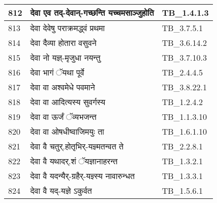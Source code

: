 \documentclass[17pt]{extarticle}
\begin{document}
\begin{longtable}{||p{0.4in}||p{4.9in}||p{0.9in}||}
    \hline
        
    812 & देवा एव तद्{-}देवान्{-}गच्छन्ति यच्चमसाञ्जुहोति & TB\_1.4.1.3       \\
    
    \hline
        
    813 & देवा देवेषु पराक्रमद्ध्वं प्रथमा & TB\_3.7.5.1       \\
    
    \hline
        
    814 & देवा दैव्या होतारा वसुवने & TB\_3.6.14.2       \\
    
    \hline
        
    815 & देवा नो यज्ञ्{-}मृजुधा नयन्तु & TB\_3.7.10.3       \\
    
    \hline
        
    816 & देवा भागं ॅयथा पूर्वे & TB\_2.4.4.5       \\
    
    \hline
        
    817 & देवा वा अश्वमेधे पवमाने & TB\_3.8.22.1       \\
    
    \hline
        
    818 & देवा वा आदित्यस्य सुवर्गस्य & TB\_1.2.4.2       \\
    
    \hline
        
    819 & देवा वा ऊर्जं ॅव्यभजन्त & TB\_1.1.3.10       \\
    
    \hline
        
    820 & देवा वा ओषधीष्वाजिमयुः ता & TB\_1.6.1.10       \\
    
    \hline
        
    821 & देवा वै चतुर्.होतृभिर्{-}यज्ञ्मतन्वत ते & TB\_2.2.8.1       \\
    
    \hline
        
    822 & देवा वै यथादर्.शं ॅयज्ञानाहरन्त & TB\_1.3.2.1       \\
    
    \hline
        
    823 & देवा वै यदन्यैर्{-}ग्रहैर्{-}यज्ञ्स्य नावारुन्धत & TB\_1.3.3.1       \\
    
    \hline
        
    824 & देवा वै यद्{-}यज्ञे ऽकुर्वत & TB\_1.5.6.1       \\
    

\end{longtable}
\end{document}
